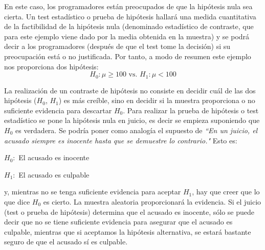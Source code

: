 En este caso, los programadores están preocupados de que la hipótesis nula sea cierta. Un test estadístico o
prueba de hipótesis hallará una medida cuantitativa de la factibilidad de la hipótesis nula (denominado
estadístico de contraste, que para este ejemplo viene dado por la media obtenida en la muestra) y se podrá
decir a los programadores (después de que el test tome la decisión) si su preocupación está o no justificada.
Por tanto, a modo de resumen este ejemplo nos proporciona dos hipótesis:
$$H_0: \mu \geq 100 \mbox{ vs. } H_1: \mu < 100$$

La realización de un contraste de hipótesis no consiste en decidir cuál de las dos hipótesis ($H_0$, $H_1$) es más
creíble, sino en decidir si la muestra proporciona o no suficiente evidencia para descartar $H_0$. Para realizar la
prueba de hipótesis o test estadístico se pone la hipótesis nula en juicio, es decir se empieza suponiendo que $H_0$
es verdadera. Se podría poner como analogía el supuesto de \textit{``En un juicio, el acusado siempre es inocente
hasta que se demuestre lo contrario."} Esto es:
\begin{center}
$H_0:$ El acusado es inocente

$H_1:$ El acusado es culpable
\end{center}
y, mientras no se tenga suficiente evidencia para aceptar $H_1$, hay que creer que lo que dice $H_0$ es cierto. La
muestra aleatoria proporcionará la evidencia. Si el juicio (test o prueba de hipótesis) determina que el acusado
es inocente, sólo se puede decir que no se tiene suficiente evidencia para asegurar que el acusado es culpable,
mientras que si aceptamos la hipótesis alternativa, se estará bastante seguro de que el acusado sí es culpable.


